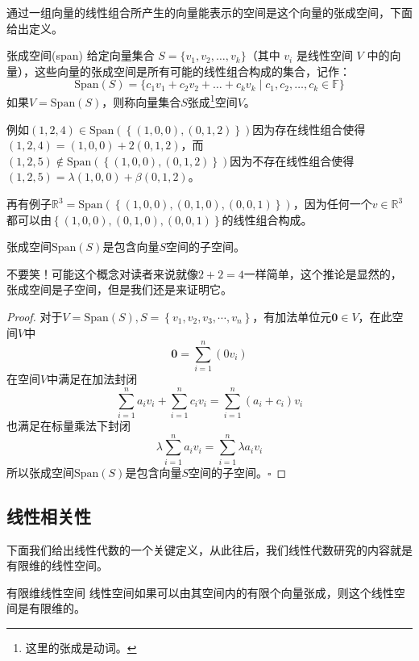 通过一组向量的线性组合所产生的向量能表示的空间是这个向量的张成空间，下面给出定义。

\begin{definition}{张成空间(span)}
	给定向量集合 $ S = \{v_1, v_2, \dots, v_k\} $（其中 $ v_i $ 是线性空间 $ V $ 中的向量），这些向量的张成空间是所有可能的线性组合构成的集合，记作：$$\text{Span}(S) = \{ c_1 v_1 + c_2 v_2 + \dots + c_k v_k \mid c_1, c_2, \dots, c_k \in \mathbb{F} \}$$如果$V=\text{Span}(S)$，则称向量集合$S$张成\footnote{这里的张成是动词。}空间$V$。
\end{definition}

例如$(1,2,4) \in \text{Span}(\left\{ (1,0,0),(0,1,2) \right\})$因为存在线性组合使得$(1,2,4)=(1,0,0)+2(0,1,2)$，而$(1,2,5) \notin \text{Span}(\left\{ (1,0,0),(0,1,2) \right\})$因为不存在线性组合使得$(1,2,5)=\lambda (1,0,0)+\beta (0,1,2)$。

再有例子$\mathbb{R}^3=\text{Span}(\left\{ (1,0,0),(0,1,0),(0,0,1) \right\})$，因为任何一个$v\in \mathbb{R}^3$都可以由$\left\{ (1,0,0),(0,1,0),(0,0,1) \right\}$的线性组合构成。

\begin{corollary}
	张成空间$\text{Span}(S)$是包含向量$S$空间的子空间。
\end{corollary}

不要笑！可能这个概念对读者来说就像$2+2=4$一样简单，这个推论是显然的，张成空间是子空间，但是我们还是来证明它。

\begin{proof}
	对于$V=\text{Span}(S),S=\left\{ v_1,v_2,v_3,\cdots,v_n \right\}$，有加法单位元$\boldsymbol{0}\in V$，在此空间$V$中$$\boldsymbol{0}=\sum_{i=1}^{n}(0v_i) $$在空间$V$中满足在加法封闭$$\sum_{i=1}^{n}a_iv_i+ \sum_{i=1}^{n}c_iv_i=\sum_{i=1}^{n}(a_i+c_i)v_i$$也满足在标量乘法下封闭$$\lambda \sum_{i=1}^{n}a_iv_i= \sum_{i=1}^{n}\lambda a_iv_i$$所以张成空间$\text{Span}(S)$是包含向量$S$空间的子空间。$\square$
\end{proof}

\subsection{线性相关性}

下面我们给出线性代数的一个关键定义，从此往后，我们线性代数研究的内容就是有限维的线性空间。

\begin{definition}{有限维线性空间}
	线性空间如果可以由其空间内的有限个向量张成，则这个线性空间是有限维的。
\end{definition}

